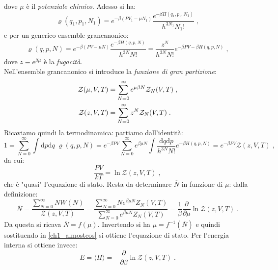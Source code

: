 \documentclass[10pt,a4paper]{report}
\theoremstyle{definition}
\numberwithin{equation}{section}
\newcommand{\diff}[1][]{\mathrm{d}#1}
\newcommand{\bra}{\langle}
\newcommand{\ket}{\rangle}
\newcommand{\zpart}{\mathcal{Z}}
\begin{document}
dove $\mu$ è il \emph{potenziale chimico}. Adesso si ha:
$$
\varrho(q_1,p_1,N_1)=e^{-\beta(PV_1-\mu N_1)}\frac{e^{-\beta H(q_1,p_1,N_1)}}{h^{3N_1}N_1!}\;,
$$
e per un generico ensemble grancanonico:
\begin{equation}
\varrho(q,p,N)=e^{-\beta(PV-\mu N)}\frac{e^{-\beta H(q,p,N)}}{h^{3N}N!}=\frac{z^N}{h^{3N}N!}e^{-\beta PV-\beta H(q,p,N)}\;,
\end{equation}
dove $z\equiv e^{\beta\mu}$ è la \emph{fugacità}. \\
Nell'ensemble grancanonico si introduce la \emph{funzione di gran partizione}:
\begin{align}
\zpart(\mu,V,T) &= \sum_{N=0}^{\infty}e^{\mu\beta N}\zpart_N(V,T) \notag \;,\\
\zpart(z,V,T) &= \sum_{N=0}^{\infty}z^N\zpart_N(V,T)\;.
\end{align}
Ricaviamo quindi la termodinamica: partiamo dall'identità:
$$
1=\sum_{N=0}^{\infty}\int\diff{p}\diff{q}\;\varrho(q,p,N)=e^{-\beta PV}\sum_{N=0}^{\infty}e^{\beta\mu N}\int\frac{\diff{q}\diff{p}}{h^{3N}N!}e^{-\beta H(q,p,N)}=e^{-\beta PV}\zpart(z,V,T)\;,
$$
da cui:
\begin{equation}
\frac{PV}{kT}=\ln\zpart(z,V,T)\;, \label{ch1_almosteos}
\end{equation}
che è "quasi" l'equazione di stato. Resta da determinare $\overline{N}$ in funzione di $\mu$: dalla definizione:
\begin{equation}
\overline{N}=\frac{\sum_{N=0}^{\infty}NW(N)}{\zpart(z,V,T)}=\frac{\sum_{N=0}^{\infty}Ne^{\beta\mu N}Z_N(V,T)}{\sum_{N=0}^{\infty}e^{\beta\mu N}Z_N(V,T)}=\frac{1}{\beta}\frac{\partial}{\partial\mu}\ln\zpart(z,V,T)\;.
\end{equation}
Da questa si ricava $\overline{N}=f(\mu)$. Invertendo si ha $\mu=f^{-1}(\overline{N})$ e quindi sostituendo in \eqref{ch1_almosteos} si ottiene l'equazione di stato. Per l'energia interna si ottiene invece:
\begin{equation}
E=\bra H\ket=-\frac{\partial}{\partial\beta}\ln\zpart(z,V,T)\;.
\end{equation}
\end{document}
